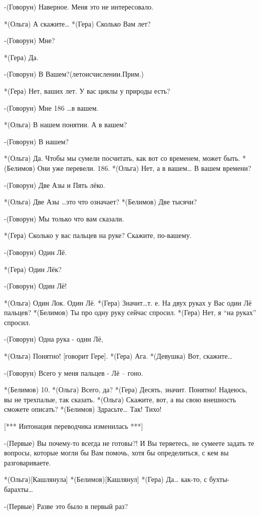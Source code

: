 -(Говорун) Наверное. Меня это не интересовало.

*(Ольга) А скажите…
*(Гера) Сколько Вам лет?

-(Говорун) Мне?

*(Гера) Да.

-(Говорун) В Вашем?(летоисчислении.Прим.)

*(Гера) Нет, ваших лет. У вас циклы у природы есть?

-(Говорун) Мне 186 …в вашем.

*(Ольга) В нашем понятии. А в вашем?

-(Говорун) В нашем?

*(Ольга) Да. Чтобы мы сумели посчитать, как вот со временем, может быть.
*(Белимов) Они уже перевели.  186.
*(Ольга) Нет, а в вашем… В вашем времени?

-(Говорун) Две Азы и Пять лёко.

*(Ольга) Две Азы …это что означает?
*(Белимов) Две тысячи?

-(Говорун) Мы только что вам сказали.

*(Гера) Сколько у вас пальцев на руке? Скажите, по-вашему.

-(Говорун) Один Лё.

*(Гера) Один Лёк?

-(Говорун) Один Лё!

*(Ольга) Один Лок. Один Лё.
*(Гера) Значит…т. е. На двух руках у Вас один Лё пальцев?
*(Белимов) Ты про одну руку сейчас спросил.
*(Гера) Нет, я “на руках” спросил.

-(Говорун) Одна рука - один Лё, 

*(Ольга) Понятно! [говорит Гере].
*(Гера) Ага.
*(Девушка) Вот, скажите…

-(Говорун) Всего у меня пальцев  - Лё – гоно.

*(Белимов) 10.
*(Ольга) Всего, да?
*(Гера) Десять, значит. Понятно! Надеюсь, вы не трехпалые, так сказать.
*(Ольга) Скажите, вот, а вы свою внешность сможете описать?
*(Белимов) Здрасьте… Так! Тихо!

[*** Интонация переводчика изменилась ***]

-(Первые) Вы почему-то всегда не готовы?! И Вы теряетесь, не сумеете задать те вопросы, которые могли бы Вам помочь, хотя бы определиться, с кем вы разговариваете.

*(Ольга)[Кашлянула]
*(Белимов)[Кашлянул]
*(Гера) Да… как-то, с бухты-барахты…

-(Первые) Разве это было в первый раз?

